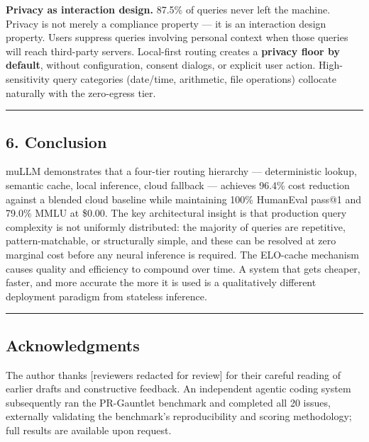 \textbf{Privacy as interaction design.} 87.5\% of queries never left the machine. Privacy is not merely a compliance property --- it is an interaction design property. Users suppress queries involving personal context when those queries will reach third-party servers. Local-first routing creates a \textbf{privacy floor by default}, without configuration, consent dialogs, or explicit user action. High-sensitivity query categories (date/time, arithmetic, file operations) collocate naturally with the zero-egress tier.

\begin{center}\rule{0.5\linewidth}{0.5pt}\end{center}

\subsection{6. Conclusion}\label{conclusion}

muLLM demonstrates that a four-tier routing hierarchy --- deterministic lookup, semantic cache, local inference, cloud fallback --- achieves 96.4\% cost reduction against a blended cloud baseline while maintaining 100\% HumanEval pass@1 and 79.0\% MMLU at \$0.00. The key architectural insight is that production query complexity is not uniformly distributed: the majority of queries are repetitive, pattern-matchable, or structurally simple, and these can be resolved at zero marginal cost before any neural inference is required. The ELO-cache mechanism causes quality and efficiency to compound over time. A system that gets cheaper, faster, and more accurate the more it is used is a qualitatively different deployment paradigm from stateless inference.

\begin{center}\rule{0.5\linewidth}{0.5pt}\end{center}

\subsection{Acknowledgments}\label{acknowledgments}

The author thanks {[}reviewers redacted for review{]} for their careful reading of earlier drafts and constructive feedback. An independent agentic coding system subsequently ran the PR-Gauntlet benchmark and completed all 20 issues, externally validating the benchmark's reproducibility and scoring methodology; full results are available upon request.

